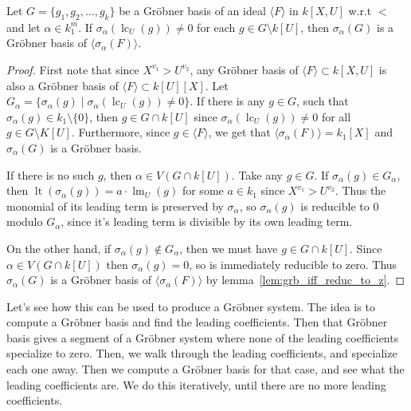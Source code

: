 \documentclass[a4paper, 12pt]{article}
\DeclareMathOperator{\LT}{lt}
\DeclareMathOperator{\LM}{lm}
\DeclareMathOperator{\LC}{lc}
\theoremstyle{changedot}
\theoremstyle{changedotbreak}
\theoremstyle{nonumberplain}
\newtheorem{proof}{Proof}
\begin{document}
\begin{lemma}\label{lem:grb_if_nmap_to_z}
  Let $G = \{g_{1}, g_{2}, \dots, g_{k}\}$ be a Gröbner basis of an ideal $\langle F \rangle$ in $k[X, U]$ w.r.t $<$ and let $\alpha \in k_{1}^{m}$. If $\sigma_{\alpha}(\LC_{U}(g)) \neq 0$ for each $g \in G \setminus k[U]$, then $\sigma_{\alpha}(G)$ is a Gröbner basis of $\langle \sigma_{\alpha}(F) \rangle$.
\end{lemma}
\begin{proof}
  First note that since $X^{v_{1}} > U^{v_{2}}$, any Gröbner basis of $\langle F \rangle \subset k[X, U]$ is also a Gröbner basis of $\langle F \rangle \subset k[U][X]$. Let $G_{\alpha} = \{\sigma_{\alpha}(g) \mid \sigma_{\alpha}(\LC_{U}(g)) \neq 0\}$. If there is any $g \in G$, such that $\sigma_{\alpha}(g) \in k_{1} \setminus \{0\}$, then $g \in G \cap k[U]$ since $\sigma_{\alpha}(\LC_{U}(g)) \neq 0$ for all $g \in G \setminus K[U]$. Furthermore, since $g \in \langle F \rangle$, we get that $\langle \sigma_{\alpha}(F) \rangle = k_{1}[X]$ and $\sigma_{\alpha}(G)$ is a Gröbner basis.

  If there is no such $g$, then $\alpha \in V(G \cap k[U])$. Take any $g \in G$. If $\sigma_{\alpha}(g) \in G_{\alpha}$, then $\LT(\sigma_{\alpha}(g)) = a \cdot \LM_{U}(g)$ for some $a \in k_{1}$ since $X^{v_{1}} > U^{v_{2}}$. Thus the monomial of its leading term is preserved by $\sigma_{\alpha}$, so $\sigma_{\alpha}(g)$ is reducible to $0$ modulo $G_{\alpha}$, since it's leading term is divisible by its own leading term.

  On the other hand, if $\sigma_{\alpha}(g) \notin G_{\alpha}$, then we must have $g \in G \cap k[U]$. Since $\alpha \in V(G \cap k[U])$ then $\sigma_{\alpha}(g) = 0$, so is immediately reducible to zero. Thus $\sigma_{\alpha}(G)$ is a Gröbner basis of $\langle \sigma_{\alpha}(F) \rangle$ by lemma~\ref{lem:grb_iff_reduc_to_z}.
\end{proof}

Let's see how this can be used to produce a Gröbner system. The idea is to compute a Gröbner basis and find the leading coefficients. Then that Gröbner basis gives a segment of a Gröbner system where none of the leading coefficients specialize to zero. Then, we walk through the leading coefficients, and specialize each one away. Then we compute a Gröbner basis for that case, and see what the leading coefficients are. We do this iteratively, until there are no more leading coefficients.
\end{document}
